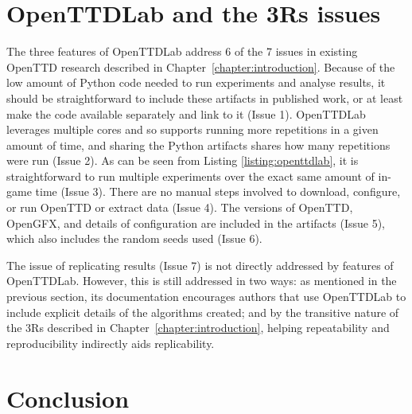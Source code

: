\documentclass[logo,msc,dsti]{style/infthesis}    %
\begin{document}
{%

\section{OpenTTDLab and the 3Rs issues}

The three features of OpenTTDLab address 6 of the 7 issues in existing OpenTTD research described in Chapter~\ref{chapter:introduction}. Because of the low amount of Python code needed to run experiments and analyse results, it should be straightforward to include these artifacts in published work, or at least make the code available separately and link to it (Issue 1). OpenTTDLab leverages multiple cores and so supports running more repetitions in a given amount of time, and sharing the Python artifacts shares how many repetitions were run (Issue 2). As can be seen from Listing \ref{listing:openttdlab}, it is straightforward to run multiple experiments  over the exact same amount of in-game time (Issue 3). There are no manual steps involved to download, configure, or run OpenTTD or extract data (Issue 4). The versions of OpenTTD, OpenGFX, and details of configuration are included in the artifacts (Issue 5), which also includes the random seeds used (Issue 6).

The issue of replicating results (Issue 7) is not directly addressed by features of OpenTTDLab. However, this is still addressed in two ways: as mentioned in the previous section, its documentation encourages authors that use OpenTTDLab to include explicit details of the algorithms created; and by the transitive nature of the 3Rs described in Chapter~\ref{chapter:introduction}, helping repeatability and reproducibility indirectly aids replicability.

\section{Conclusion}

}
\end{document}
